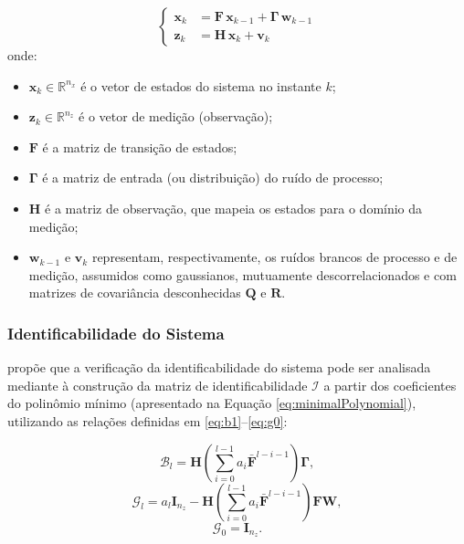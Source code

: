 \documentclass[journal]{IEEEtran}
\begin{document}
\begin{equation}
    \label{eq:gaussMarkov}
\begin{cases}
    \mathbf{x}_k &= \mathbf{F} \,\mathbf{x}_{k-1} + \mathbf{\Gamma}\,\mathbf{w}_{k-1} \\ 
    \mathbf{z}_k &= \mathbf{H}\,\mathbf{x}_k + \mathbf{v}_k       
\end{cases}
\end{equation}
onde:
\begin{itemize}
    \item $\mathbf{x}_k \in \mathbb{R}^{n_x}$ é o vetor de estados do sistema no instante $k$;
    \item $\mathbf{z}_k \in \mathbb{R}^{n_z}$ é o vetor de medição (observação);
    \item $\mathbf{F}$ é a matriz de transição de estados;
    \item $\mathbf{\Gamma}$ é a matriz de entrada (ou distribuição) do ruído de processo;
    \item $\mathbf{H}$ é a matriz de observação, que mapeia os estados para o domínio da medição;
    \item $\mathbf{w}_{k-1}$ e $\mathbf{v}_k$ representam, respectivamente, os ruídos brancos de processo e de medição, assumidos como gaussianos, mutuamente descorrelacionados e com matrizes de covariância desconhecidas $\mathbf{Q}$ e $\mathbf{R}$.
\end{itemize}

\subsubsection{Identificabilidade do Sistema}

\cite{zhang2020} propõe que a verificação da identificabilidade do sistema pode ser analisada mediante à construção da matriz de identificabilidade $\mathbf{\mathcal{I}}$ a partir dos coeficientes do polinômio mínimo (apresentado na Equação \eqref{eq:minimalPolynomial}), utilizando as relações definidas em \eqref{eq:b1}--\eqref{eq:g0}:

\begin{equation}
    \label{eq:b1}
    \mathbf{\mathcal{B}}_l = \mathbf{H} \left( \sum_{i=0}^{l-1} a_i \mathbf{\bar{F}}^{l-i-1} \right) \mathbf{\Gamma},
\end{equation}
\begin{equation}
    \label{eq:ga}
    \mathbf{\mathcal{G}}_l = a_l \mathbf{I}_{n_z} - \mathbf{H} \left( \sum_{i=0}^{l-1} a_i \mathbf{\bar{F}}^{l-i-1} \right) \mathbf{FW},
\end{equation}
\begin{equation}
    \label{eq:g0}
    \mathbf{\mathcal{G}}_0 = \mathbf{I}_{n_z}.
\end{equation}
\end{document}
